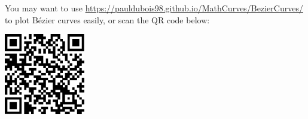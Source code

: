 \documentclass[a4paper, top=10mm]{article}
\begin{document}
	You may want to use \url{https://pauldubois98.github.io/MathCurves/BezierCurves/} to plot Bézier curves easily, or scan the QR code below:
	\begin{center}
		\includegraphics[height=100pt]{09QR_Bezier.png}
	\end{center}
	
	
\end{document}
